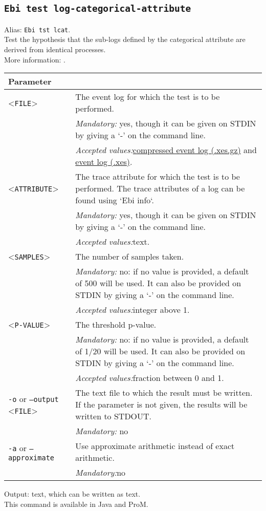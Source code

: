 {\subsection{\texttt{Ebi test log-categorical-attribute}}
\label{command:Ebi test log-categorical-attribute}
Alias: \texttt{Ebi tst lcat}.\\
Test the hypothesis that the sub-logs defined by the categorical attribute are derived from identical processes.\\
More information: \cite{DBLP:journals/tkde/LeemansMPH23}.\\
\begin{tabularx}{\linewidth}{lX}
\toprule
Parameter \\\midrule
<\texttt{FILE}>&The event log for which the test is to be performed.\\
&\textit{Mandatory:} \quad yes, though it can be given on STDIN by giving a `-' on the command line.\\
&\textit{Accepted values:}\quad \hyperref[filehandler:compressed event log]{compressed event log (.xes.gz)} and \hyperref[filehandler:event log]{event log (.xes)}.\\
<\texttt{ATTRIBUTE}>&The trace attribute for which the test is to be performed. The trace attributes of a log can be found using `Ebi info`.\\
&\textit{Mandatory:} \quad yes, though it can be given on STDIN by giving a `-' on the command line.\\
&\textit{Accepted values:}\quad text.\\
<\texttt{SAMPLES}>&The number of samples taken.\\
&\textit{Mandatory:} \quad no: if no value is provided, a default of 500 will be used. It can also be provided on STDIN by giving a `-' on the command line.\\
&\textit{Accepted values:}\quad integer above 1.\\
<\texttt{P-VALUE}>&The threshold p-value.\\
&\textit{Mandatory:} \quad no: if no value is provided, a default of 1/20 will be used. It can also be provided on STDIN by giving a `-' on the command line.\\
&\textit{Accepted values:}\quad fraction between 0 and 1.\\
\texttt{-o} or \texttt{--output} <\texttt{FILE}> &
The text file to which the result must be written. If the parameter is not given, the results will be written to STDOUT.\\
&\textit{Mandatory:} \quad no\\
\texttt{-a} or \texttt{--approximate} & Use approximate arithmetic instead of exact arithmetic.\\
&\textit{Mandatory:}\quad no\\
\bottomrule
\end{tabularx}
\noindent Output: text, which can be written as  text.
\\This command is available in Java and ProM.
}
